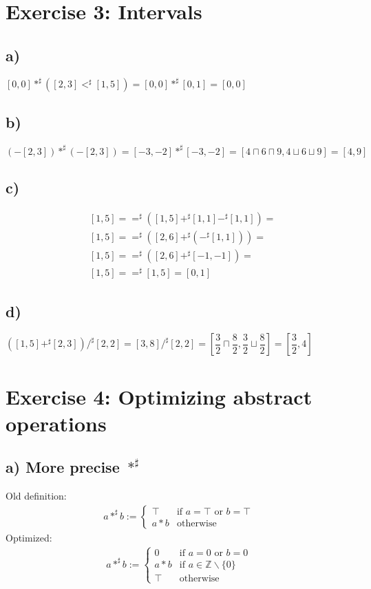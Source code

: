 \documentclass[11pt,a4paper]{scrartcl}
\begin{document}
\section*{Exercise 3: Intervals}
\subsection*{a)}
$[0,0] *^\sharp ([2,3] <^\sharp [1,5]) = [0,0] *^\sharp [0,1] = [0,0]$

\subsection*{b)}
$(-[2,3]) *^\sharp (-[2,3]) = [-3,-2] *^\sharp [-3,-2] = [4 \sqcap 6 \sqcap 9, 4 \sqcup 6 \sqcup 9] = [4,9]$

\subsection*{c)}
\begin{align*}
&[1,5] ==^\sharp ([1,5] +^\sharp [1,1] -^\sharp [1,1]) = \\
&[1,5] ==^\sharp ([2,6] +^\sharp (-^\sharp [1,1])) = \\
&[1,5] ==^\sharp ([2,6] +^\sharp [-1,-1]) = \\
&[1,5] ==^\sharp [1,5] = [0,1]
\end{align*}

\subsection*{d)}
$([1,5] +^\sharp [2,3]) /^\sharp [2,2] = [3,8] /^\sharp [2,2] = [\dfrac{3}{2} \sqcap \dfrac{8}{2}, \dfrac{3}{2} \sqcup \dfrac{8}{2}] = [\dfrac{3}{2}, 4]$


\section*{Exercise 4: Optimizing abstract operations}
\subsection*{a) More precise $*^\sharp$}
Old definition:
\begin{align*}
a *^\sharp b := \left\{ \begin{array}{ll}
\top &\mbox{if } a=\top \mbox{ or } b=\top \\
a*b  &\mbox{otherwise}
\end{array}\right.
\end{align*}
Optimized:
\begin{align*}
a *^\sharp b := \left\{ \begin{array}{ll}
0 &\mbox{if } a=0 \mbox{ or } b=0 \\
a*b  &\mbox{if } a \in \mathbb{Z} \backslash \{0\} \\
\top &\mbox{otherwise}
\end{array}\right.
\end{align*}
\end{document}
